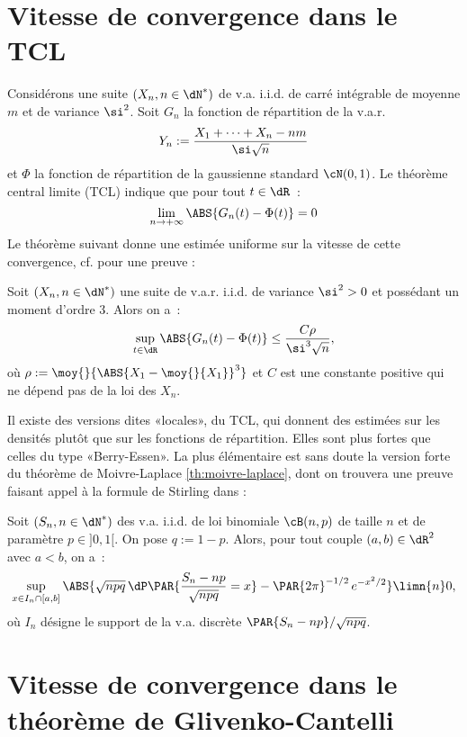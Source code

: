 %
\section{Vitesse de convergence dans le TCL}
%

Considérons une suite $(X_n,n\in\dN^*)$ de v.a. i.i.d. de carré intégrable de
moyenne $m$ et de variance $\si^2$. Soit $G_n$ la fonction de répartition de
la v.a.r.
$$
Y_n:=\frac{X_1+\cdots+X_n-nm}{\si\sqrt{n}}
$$
et $\Phi$ la fonction de répartition de la gaussienne standard $\cN(0,1)$. Le
théorème central limite (TCL) indique que pour tout $t\in\dR$~:
$$
\lim_{n\to+\infty}\ABS{G_n(t)-\Phi(t)}=0
$$
Le théorème suivant donne une estimée uniforme sur la vitesse de cette
convergence, cf. \cite{petrov} pour une preuve :

\begin{thm}
  Soit $(X_n,n\in\dN^*)$ une suite de v.a.r. i.i.d. de variance $\si^2>0$ et
  possédant un moment d'ordre $3$. Alors on a~:
  $$
  \sup_{t\in\dR}\ABS{G_n(t)-\Phi(t)} \leq \frac{C\rho}{\si^3\sqrt{n}},
  $$
  où $\rho:=\moy{}{\ABS{X_1-\moy{}{X_1}}^3}$ et $C$ est une constante positive qui ne
  dépend pas de la loi des $X_n$.
\end{thm}

Il existe des versions dites «locales», du TCL, qui donnent des estimées sur
les densités plutôt que sur les fonctions de répartition. Elles sont plus
fortes que celles du type «Berry-Essen».  La plus élémentaire est sans doute
la version forte du théorème de Moivre-Laplace \ref{th:moivre-laplace}, dont
on trouvera une preuve faisant appel à la formule de Stirling dans \cite[thm
2.2.4 page 35]{dacunha-castelle-duflo} :

\begin{thm}\label{th:moivre-laplace-fort}
  Soit $(S_n,n\in\dN^*)$ des v.a. i.i.d. de loi binomiale $\cB(n,p)$ de taille
  $n$ et de paramètre $p\in]0,1[$. On pose $q:=1-p$. Alors, pour tout couple
  $(a,b)\in\dR^2$ avec $a<b$, on a~:
  $$
  \sup_{x\in I_n\cap[a,b]}
  \ABS{\sqrt{npq}\,\dP\PAR{\frac{S_n-np}{\sqrt{npq}}=x}-\PAR{2\pi}^{-1/2}\,e^{-x^2/2}}
  \limn{n} 0,
  $$
  où $I_n$ désigne le support de la v.a. discrète $\PAR{S_n-np}/\sqrt{npq}$.
\end{thm}

%
\section{Vitesse de convergence dans le théorème de Glivenko-Cantelli}
\label{se:vitesse-tgc}
%

